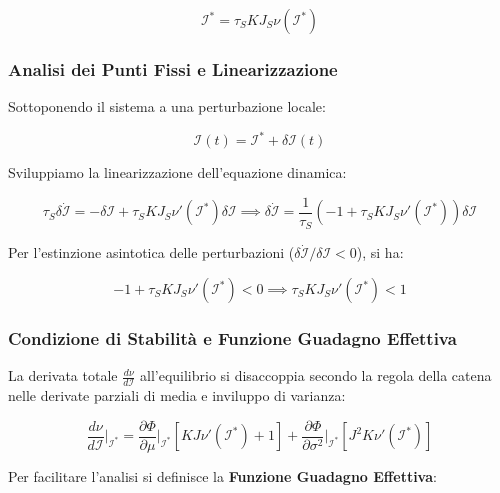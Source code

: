 \begin{equation}
\mathcal{I}^* = \tau_S K J_S \nu(\mathcal{I}^*)
\end{equation}

\subsubsection{Analisi dei Punti Fissi e Linearizzazione}

Sottoponendo il sistema a una perturbazione locale:

\begin{equation}
\mathcal{I}(t) = \mathcal{I}^* + \delta\mathcal{I}(t)
\end{equation}

Sviluppiamo la linearizzazione dell'equazione dinamica:

\begin{equation}
\tau_S \delta\dot{\mathcal{I}} = -\delta\mathcal{I} + \tau_S K J_S \nu'(\mathcal{I}^*) \delta\mathcal{I} \implies \delta\dot{\mathcal{I}} = \frac{1}{\tau_S} \left( -1 + \tau_S K J_S \nu'(\mathcal{I}^*) \right) \delta\mathcal{I}
\end{equation}

Per l'estinzione asintotica delle perturbazioni ($\delta\dot{\mathcal{I}} / \delta\mathcal{I} < 0$), si ha:

\begin{equation}
-1 + \tau_S K J_S \nu'(\mathcal{I}^*) < 0 \implies \tau_S K J_S \nu'(\mathcal{I}^*) < 1
\end{equation}

\subsubsection{Condizione di Stabilità e Funzione Guadagno Effettiva}

La derivata totale $\frac{d\nu}{d\mathcal{I}}$ all'equilibrio si disaccoppia secondo la regola della catena nelle derivate parziali di media e inviluppo di varianza:

\begin{equation}
\frac{d\nu}{d\mathcal{I}}\bigg|_{\mathcal{I}^*} = \frac{\partial \Phi}{\partial \mu}\bigg|_{\mathcal{I}^*} \left[ K J \nu'(\mathcal{I}^*) + 1 \right] + \frac{\partial \Phi}{\partial \sigma^2}\bigg|_{\mathcal{I}^*} \left[ J^2 K \nu'(\mathcal{I}^*) \right]
\end{equation}

Per facilitare l'analisi si definisce la \textbf{Funzione Guadagno Effettiva}:

